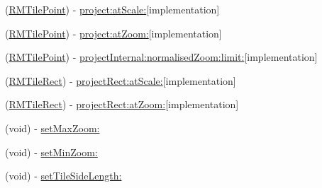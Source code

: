 \begin{DoxyCompactItemize}
(\hyperlink{struct_r_m_tile_point}{R\-M\-Tile\-Point}) -\/ \hyperlink{interface_r_m_s_m_tile_projection_a0ff895767233e8f338247faa3b2bee1f}{project\-:at\-Scale\-:}{\ttfamily  \mbox{[}implementation\mbox{]}}
\item 
(\hyperlink{struct_r_m_tile_point}{R\-M\-Tile\-Point}) -\/ \hyperlink{interface_r_m_s_m_tile_projection_a27b45f6348b6b10d0ac808a8ee6b6c97}{project\-:at\-Zoom\-:}{\ttfamily  \mbox{[}implementation\mbox{]}}
\item 
(\hyperlink{struct_r_m_tile_point}{R\-M\-Tile\-Point}) -\/ \hyperlink{interface_r_m_s_m_tile_projection_a91403688f94d9860ffd9a4af9a7b284f}{project\-Internal\-:normalised\-Zoom\-:limit\-:}{\ttfamily  \mbox{[}implementation\mbox{]}}
\item 
(\hyperlink{struct_r_m_tile_rect}{R\-M\-Tile\-Rect}) -\/ \hyperlink{interface_r_m_s_m_tile_projection_a69ee12f033da79ab6f088fb8ca11fbfd}{project\-Rect\-:at\-Scale\-:}{\ttfamily  \mbox{[}implementation\mbox{]}}
\item 
(\hyperlink{struct_r_m_tile_rect}{R\-M\-Tile\-Rect}) -\/ \hyperlink{interface_r_m_s_m_tile_projection_a8442a53b7624d621ab15d9027b48b7e9}{project\-Rect\-:at\-Zoom\-:}{\ttfamily  \mbox{[}implementation\mbox{]}}
\item 
(void) -\/ \hyperlink{interface_r_m_s_m_tile_projection_aa090a90c7fd9238520f36c5e8d3bd522}{set\-Max\-Zoom\-:}
\item 
(void) -\/ \hyperlink{interface_r_m_s_m_tile_projection_ae4a0b2dea7653070f5bf3a54fe02d853}{set\-Min\-Zoom\-:}
\item 
(void) -\/ \hyperlink{interface_r_m_s_m_tile_projection_a722806637be1f62337dde8c6c9daba82}{set\-Tile\-Side\-Length\-:}
\end{DoxyCompactItemize}
